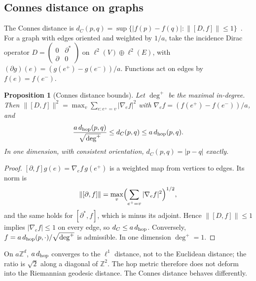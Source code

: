 \documentclass[11pt]{article}
\newtheorem{proposition}{Proposition}[section]
\theoremstyle{remark}\newtheorem*{remark}{Remark}
\newcommand{\ZZ}{\mathbb{Z}}
\begin{document}
\subsection{Connes distance on graphs}
The Connes distance is $d_C(p,q)=\sup\{|f(p)-f(q)|:\|[D,f]\|\le1\}$~\cite{ConnesBook,Connes96}. For a graph with edges oriented
and weighted by $1/a$, take the incidence Dirac operator $D=\begin{pmatrix}0&\partial^*\\\partial&0\end{pmatrix}$ on
$\ell^2(V)\oplus\ell^2(E)$, with $(\partial g)(e)=(g(e^+)-g(e^-))/a$. Functions act on edges by $f(e)=f(e^-)$.

\begin{proposition}[Connes distance bounds]
\label{prop:connes}
Let $\deg^+$ be the maximal in-degree. Then $\|[D,f]\|^2=\max_v\sum_{e:e^+=v}|\nabla_ef|^2$ with
$\nabla_ef=(f(e^+)-f(e^-))/a$, and
\begin{equation}
\frac{a\,d_{\rm hop}(p,q)}{\sqrt{\deg^+}}\le d_C(p,q)\le a\,d_{\rm hop}(p,q).
\end{equation}
In one dimension, with consistent orientation, $d_C(p,q)=|p-q|$ exactly.
\end{proposition}
\begin{proof}
$[\partial,f]g(e)=\nabla_ef\,g(e^+)$ is a weighted map from vertices to edges. Its norm is
\begin{equation*}
\|[\partial,f]\|=\max_v\Bigl(\sum_{e^+=v}|\nabla_ef|^2\Bigr)^{1/2},
\end{equation*}
and the same holds for $[\partial^*,f]$, which is minus its adjoint. Hence
$\|[D,f]\|\le1$ implies $|\nabla_ef|\le1$ on every edge, so $d_C\le a\,d_{\rm hop}$. Conversely,
$f=a\,d_{\rm hop}(p,\cdot)/\sqrt{\deg^+}$ is admissible. In one dimension $\deg^+=1$.
\end{proof}

On $a\ZZ^d$, $a\,d_{\rm hop}$ converges to the $\ell^1$ distance, not to the Euclidean distance; the ratio is $\sqrt2$
along a diagonal of $\ZZ^2$. The hop metric therefore does not deform into the Riemannian geodesic distance. The
Connes distance behaves differently.
\end{document}
